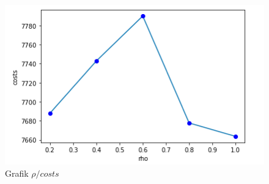 \documentclass[a4paper]{article}
\begin{document}
\begin{figure}[h!]
\begin{center}
\includegraphics[scale=0.7]{rho.png}
\end{center}
\caption{Grafik $\rho / costs$}
\label{fig:rho}
\end{figure}

\newpage


 

\nocite{opt}
\nocite{oppfanc}
\nocite{aneffect}
\nocite{mat}
\nocite{solvingTSP}
\end{document}

